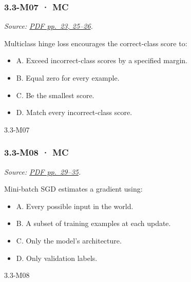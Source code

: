 \noindent\begin{minipage}{\linewidth}

\subsubsection{3.3-M07 · MC}\label{m07-mc-9}

\emph{Source:
\href{../Lecture\%20Slides/3.3.\%20Deep\%20Learning\%20Fundamentals.pdf\#page=23}{PDF
pp.~23, 25--26}.}

Multiclass hinge loss encourages the correct-class score to:

\begin{itemize}
\tightlist
\item
  A. Exceed incorrect-class scores by a specified margin.
\item
  B. Equal zero for every example.
\item
  C. Be the smallest score.
\item
  D. Match every incorrect-class score.
\end{itemize}

\begin{solution}[8mm]{3.3-M07}

\end{solution}
\end{minipage}\par\medskip

\noindent\begin{minipage}{\linewidth}

\subsubsection{3.3-M08 · MC}\label{m08-mc-9}

\emph{Source:
\href{../Lecture\%20Slides/3.3.\%20Deep\%20Learning\%20Fundamentals.pdf\#page=29}{PDF
pp.~29--35}.}

Mini-batch SGD estimates a gradient using:

\begin{itemize}
\tightlist
\item
  A. Every possible input in the world.
\item
  B. A subset of training examples at each update.
\item
  C. Only the model's architecture.
\item
  D. Only validation labels.
\end{itemize}

\begin{solution}[8mm]{3.3-M08}

\end{solution}
\end{minipage}\par\medskip

